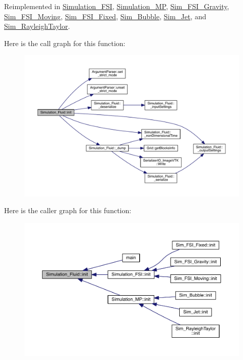 Reimplemented in \hyperlink{class_simulation___f_s_i_a2b00ce68b50616922096fad82f08d46e}{Simulation\+\_\+\+F\+S\+I}, \hyperlink{class_simulation___m_p_a73871acbc78c147123049a5be3961a94}{Simulation\+\_\+\+M\+P}, \hyperlink{class_sim___f_s_i___gravity_a5a3a289351a8c5be69fd233a79d436ef}{Sim\+\_\+\+F\+S\+I\+\_\+\+Gravity}, \hyperlink{class_sim___f_s_i___moving_abaea71814c7a3cedf36817d0c0da3efc}{Sim\+\_\+\+F\+S\+I\+\_\+\+Moving}, \hyperlink{class_sim___f_s_i___fixed_ab5da7ce7b36599b497d8089ad93a99f0}{Sim\+\_\+\+F\+S\+I\+\_\+\+Fixed}, \hyperlink{class_sim___bubble_ae06e5f52f73f0c4e45e049ff8619703e}{Sim\+\_\+\+Bubble}, \hyperlink{class_sim___jet_aec86e6b61d327624b44b4b6e9136845f}{Sim\+\_\+\+Jet}, and \hyperlink{class_sim___rayleigh_taylor_a55ee82000e3f09d000473f7dd270f450}{Sim\+\_\+\+Rayleigh\+Taylor}.



Here is the call graph for this function\+:
\nopagebreak
\begin{figure}[H]
\begin{center}
\leavevmode
\includegraphics[width=350pt]{d0/d35/class_simulation___fluid_a86324788163a191e09a90ff35471604e_cgraph}
\end{center}
\end{figure}




Here is the caller graph for this function\+:\nopagebreak
\begin{figure}[H]
\begin{center}
\leavevmode
\includegraphics[width=350pt]{d0/d35/class_simulation___fluid_a86324788163a191e09a90ff35471604e_icgraph}
\end{center}
\end{figure}


